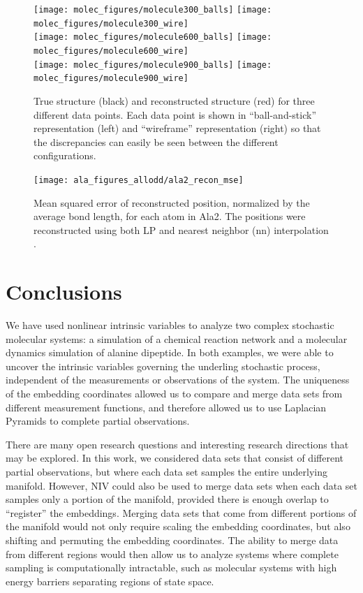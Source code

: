 \documentclass[aip,jcp,preprint]{revtex4-1}
\begin{document}
\begin{figure}[ht]
    \centering
    \texttt{[image: molec\_figures/molecule300\_balls]}
    \texttt{[image: molec\_figures/molecule300\_wire]}\\
    \texttt{[image: molec\_figures/molecule600\_balls]}
    \texttt{[image: molec\_figures/molecule600\_wire]}\\
    \texttt{[image: molec\_figures/molecule900\_balls]}
    \texttt{[image: molec\_figures/molecule900\_wire]}
    \caption{True structure (black) and reconstructed structure (red) for three different data points. Each data point is shown in ``ball-and-stick'' representation (left) and ``wireframe'' representation (right) so that the discrepancies can easily be seen between the different configurations.}
    \label{fig:ala_molecules}
\end{figure}

\begin{figure}
    \texttt{[image: ala\_figures\_allodd/ala2\_recon\_mse]}
    \caption{Mean squared error of reconstructed position, normalized by the average bond length, for each atom in Ala2.
    The positions were reconstructed using both LP and nearest neighbor (nn) interpolation .}
    \label{fig:ala_mse}
\end{figure}

\section{Conclusions} \label{sec:conclusions}
We have used nonlinear intrinsic variables to analyze two complex stochastic molecular systems: a simulation of a chemical reaction network and a molecular dynamics simulation of alanine dipeptide.
%
In both examples, we were able to uncover the intrinsic variables governing the underling stochastic process, independent of the measurements or observations of the system.
%
The uniqueness of the embedding coordinates allowed us to compare and merge data sets from different measurement functions, and therefore allowed us to use Laplacian Pyramids to complete partial observations.

There are many open research questions and interesting research directions that may be explored.
%
In this work, we considered data sets that consist of different partial observations, but where each data set samples the entire underlying manifold.
%
However, NIV could also be used to merge data sets when each data set samples only a portion of the manifold, provided there is enough overlap to ``register'' the embeddings.
%
Merging data sets that come from different portions of the manifold would not only require scaling the embedding coordinates,
but also shifting and permuting the embedding coordinates.
%
The ability to merge data from different regions would then allow us to analyze systems where complete sampling is computationally intractable, such as molecular systems with high energy barriers separating regions of state space.
\end{document}
